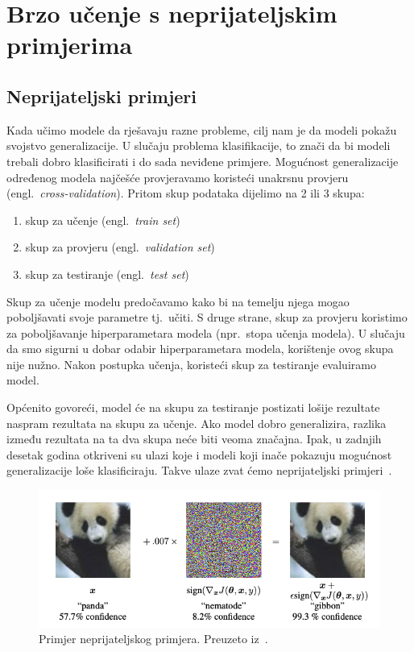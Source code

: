 \documentclass[times, utf8, zavrsni, numeric]{fer}
\begin{document}
\chapter{Brzo učenje s neprijateljskim primjerima}

\section{Neprijateljski primjeri}

Kada učimo modele da rješavaju razne probleme, cilj nam je da modeli pokažu svojstvo generalizacije. 
U slučaju problema klasifikacije, to znači da bi modeli trebali dobro klasificirati i do sada neviđene primjere.
Mogućnost generalizacije određenog modela najčešće provjeravamo koristeći unakrsnu provjeru (engl.\ \textit{cross-validation}).
Pritom skup podataka dijelimo na 2 ili 3 skupa: 

\begin{enumerate}
    \item skup za učenje (engl.\ \textit{train set})
    \item skup za provjeru (engl.\ \textit{validation set})
    \item skup za testiranje (engl.\ \textit{test set})
\end{enumerate}

Skup za učenje modelu predočavamo kako bi na temelju njega mogao poboljšavati svoje parametre tj.\ učiti. 
S druge strane, skup za provjeru koristimo za poboljšavanje hiperparametara modela (npr.\ stopa učenja modela). 
U slučaju da smo sigurni u dobar odabir hiperparametara modela, korištenje ovog skupa nije nužno. 
Nakon postupka učenja, koristeći skup za testiranje evaluiramo model.

Općenito govoreći, model će na skupu za testiranje postizati lošije rezultate naspram rezultata na skupu za učenje. 
Ako model dobro generalizira, razlika između rezultata na ta dva skupa neće biti veoma značajna. 
Ipak, u zadnjih desetak godina otkriveni su ulazi koje i modeli koji inače pokazuju mogućnost generalizacije loše klasificiraju.
Takve ulaze zvat ćemo neprijateljski primjeri~\cite{goodfellow2014explaining}.

\pagebreak

\begin{figure}[htb]
    \centering
    \includegraphics[scale=0.5]{adversarial_example.png}
    \caption{Primjer neprijateljskog primjera. Preuzeto iz~\cite{goodfellow2014explaining}.}
    \label{fig:adv_example}
\end{figure}
\end{document}
